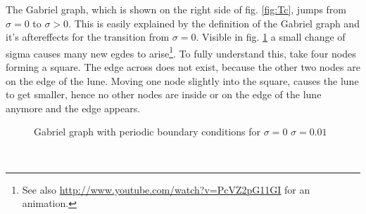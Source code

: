     The Gabriel graph, which is shown on the right side of fig. \ref{fig:Tc},
    jumps from \(\sigma = 0\) to \(\sigma > 0\). This is easily explained
    by the definition of the Gabriel graph and it's aftereffects for
    the transition from \(\sigma = 0\). Visible in fig. \ref{fig:GG_sigma}
    a small change of sigma causes many new egdes to arise\footnote{See also \url{http://www.youtube.com/watch?v=PcVZ2pG11GI} for an animation.}.
    To fully understand this, take four nodes forming a square. The edge
    across does not exist, because the other two nodes are on the edge
    of the lune. Moving one node slightly into the square, causes the lune
    to get smaller, hence no other nodes are inside or on the edge of
    the lune anymore and the edge appears.
    \begin{figure}[htbp]
        \centering
        \caption[Anomaly of the Gabriel graph for small $\sigma$]
        {
            Gabriel graph with periodic boundary conditions for
                 \(\sigma = 0\)
                 \(\sigma = 0.01\)
        }
        \label{fig:GG_sigma}
    \end{figure}\\
